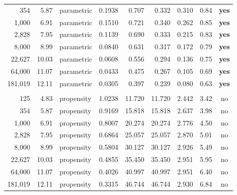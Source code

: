 \begin{tabular}{rrlrrrrrc}
354 & 5.87 & parametric & 0.1938 & 0.707 & 0.332 & 0.310 & 0.84 & \textbf{yes} \\
1,000 & 6.91 & parametric & 0.1510 & 0.721 & 0.340 & 0.262 & 0.85 & \textbf{yes} \\
2,828 & 7.95 & parametric & 0.1139 & 0.690 & 0.333 & 0.215 & 0.83 & \textbf{yes} \\
8,000 & 8.99 & parametric & 0.0840 & 0.631 & 0.317 & 0.172 & 0.79 & \textbf{yes} \\
22,627 & 10.03 & parametric & 0.0608 & 0.556 & 0.294 & 0.136 & 0.75 & \textbf{yes} \\
64,000 & 11.07 & parametric & 0.0433 & 0.475 & 0.267 & 0.105 & 0.69 & \textbf{yes} \\
181,019 & 12.11 & parametric & 0.0305 & 0.397 & 0.239 & 0.080 & 0.63 & \textbf{yes} \\
\addlinespace
\multicolumn{9}{l}{\textit{Shipped design at $c_\delta=1$, for reference}} \\
\midrule
125 & 4.83 & propensity & 1.0238 & 11.720 & 11.720 & 2.442 & 3.42 & no \\
354 & 5.87 & propensity & 0.9169 & 15.818 & 15.818 & 2.637 & 3.98 & no \\
1,000 & 6.91 & propensity & 0.8007 & 20.274 & 20.274 & 2.776 & 4.50 & no \\
2,828 & 7.95 & propensity & 0.6864 & 25.057 & 25.057 & 2.870 & 5.01 & no \\
8,000 & 8.99 & propensity & 0.5804 & 30.127 & 30.127 & 2.926 & 5.49 & no \\
22,627 & 10.03 & propensity & 0.4855 & 35.450 & 35.450 & 2.951 & 5.95 & no \\
64,000 & 11.07 & propensity & 0.4026 & 40.997 & 40.997 & 2.951 & 6.40 & no \\
181,019 & 12.11 & propensity & 0.3315 & 46.744 & 46.744 & 2.930 & 6.84 & no \\
\bottomrule
\end{tabular}
